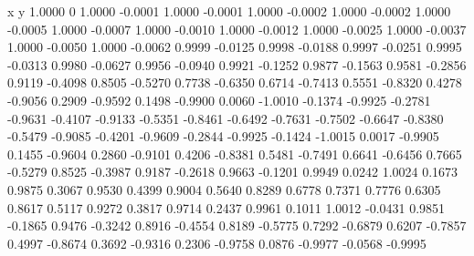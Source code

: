     x y    
    1.0000         0
    1.0000   -0.0001
    1.0000   -0.0001
    1.0000   -0.0002
    1.0000   -0.0002
    1.0000   -0.0005
    1.0000   -0.0007
    1.0000   -0.0010
    1.0000   -0.0012
    1.0000   -0.0025
    1.0000   -0.0037
    1.0000   -0.0050
    1.0000   -0.0062
    0.9999   -0.0125
    0.9998   -0.0188
    0.9997   -0.0251
    0.9995   -0.0313
    0.9980   -0.0627
    0.9956   -0.0940
    0.9921   -0.1252
    0.9877   -0.1563
    0.9581   -0.2856
    0.9119   -0.4098
    0.8505   -0.5270
    0.7738   -0.6350
    0.6714   -0.7413
    0.5551   -0.8320
    0.4278   -0.9056
    0.2909   -0.9592
    0.1498   -0.9900
    0.0060   -1.0010
   -0.1374   -0.9925
   -0.2781   -0.9631
   -0.4107   -0.9133
   -0.5351   -0.8461
   -0.6492   -0.7631
   -0.7502   -0.6647
   -0.8380   -0.5479
   -0.9085   -0.4201
   -0.9609   -0.2844
   -0.9925   -0.1424
   -1.0015    0.0017
   -0.9905    0.1455
   -0.9604    0.2860
   -0.9101    0.4206
   -0.8381    0.5481
   -0.7491    0.6641
   -0.6456    0.7665
   -0.5279    0.8525
   -0.3987    0.9187
   -0.2618    0.9663
   -0.1201    0.9949
    0.0242    1.0024
    0.1673    0.9875
    0.3067    0.9530
    0.4399    0.9004
    0.5640    0.8289
    0.6778    0.7371
    0.7776    0.6305
    0.8617    0.5117
    0.9272    0.3817
    0.9714    0.2437
    0.9961    0.1011
    1.0012   -0.0431
    0.9851   -0.1865
    0.9476   -0.3242
    0.8916   -0.4554
    0.8189   -0.5775
    0.7292   -0.6879
    0.6207   -0.7857
    0.4997   -0.8674
    0.3692   -0.9316
    0.2306   -0.9758
    0.0876   -0.9977
   -0.0568   -0.9995
  